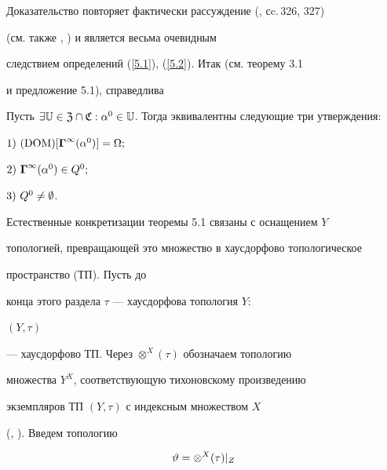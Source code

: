 Доказательство повторяет фактически рассуждение (\cite{55}, сc.\,326, 327)


(см. также \cite{25}, \cite{26}) и является весьма очевидным


следствием определений (\ref{5.1}), (\ref{5.2}). Итак (см. теорему 3.1


и предложение 5.1), справедлива








\begin{thms}


Пусть $\exi{\Bbb{U}} \in {\frak Z}\cap{\frak C}:{{\alpha}^0} \in


\Bbb{U}$. Тогда эквивалентны следующие три утверждения\/${:}$





$1)~(\operatorname{DOM})[{{\boldsymbol\Gamma}^\infty}({\alpha}^0)] = \Omega;$





$2)~{{\boldsymbol\Gamma}^\infty}({\alpha}^0) \in {Q^0};$





$3)~{Q^0} \ne \emptyset$.


\end{thms}





Естественные конкретизации теоремы 5.1 связаны с оснащением $Y$


топологией, превращающей это множество в хаусдорфово топологическое


пространство (ТП). Пусть до


конца этого раздела $\tau$ --- хаусдорфова топология $Y$:


$(Y,\tau)$


--- хаусдорфово ТП. Через ${{\otimes}^X}(\tau)$ обозначаем топологию


множества $Y^X$, соответствующую тихоновскому произведению


экземпляров ТП $(Y,\tau)$ с индексным множеством $X$


(\cite{57}, \cite{58}). Введем топологию


\begin{equation}\label{5.30}


\vt = {{\otimes}^X}(\tau)|_Z


\end{equation}


